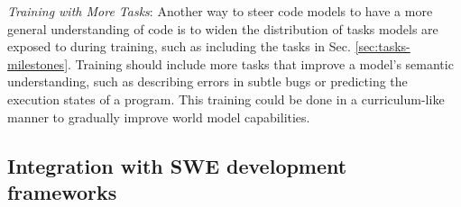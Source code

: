 \textit{Training with More Tasks}: Another way to steer code models to have a more general understanding of code is to widen the distribution of tasks models are exposed to during training, such as including the tasks in Sec. \ref{sec:tasks-milestones}. Training should include more tasks that improve a model's semantic understanding, such as describing errors in subtle bugs or predicting the execution states of a program. This training could be done in a curriculum-like manner to gradually improve world model capabilities.



\vspace{-0.25cm}

\subsection{Integration with SWE development frameworks}

\vspace{-0.1cm}

